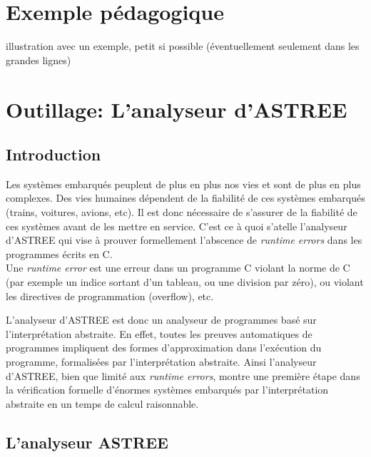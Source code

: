 \documentclass[french]{report}
\begin{document}
\section{Exemple pédagogique}

illustration avec un exemple, petit si possible  (éventuellement seulement dans les grandes lignes)

\section{Outillage: L'analyseur d'ASTREE}

\subsection{Introduction}
Les systèmes embarqués peuplent de plus en plus nos vies et sont de plus en plus complexes. Des vies humaines
dépendent de la fiabilité de ces systèmes embarqués (trains, voitures, avions, etc). Il est donc nécessaire de
s'assurer de la fiabilité de ces systèmes avant de les mettre en service.
C'est ce à quoi s'atelle l'analyseur d'ASTREE qui vise à prouver formellement
l'abscence de \textit{runtime errors} dans les programmes écrits en C. \\

Une \textit{runtime error} est une erreur dans un programme C violant la norme de C (par exemple un indice sortant
d'un tableau, ou une division par zéro), ou violant les directives de programmation (overflow), etc.

L'analyseur d'ASTREE est donc un analyseur de programmes basé sur l'interprétation abstraite. En effet, toutes les preuves
automatiques de programmes impliquent des formes d'approximation dans l'exécution du programme, formalisées par
l'interprétation abstraite.
Ainsi l'analyseur d'ASTREE, bien que limité aux \textit{runtime errors}, montre une première étape
dans la vérification formelle d'énormes systèmes embarqués par l'interprétation abstraite en un temps de calcul
raisonnable.

\subsection{L'analyseur ASTREE}
\end{document}
